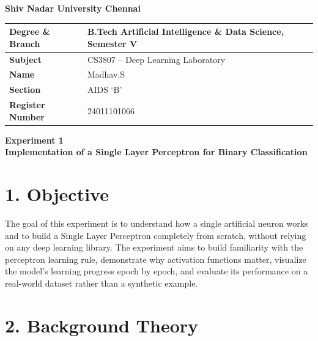 \documentclass[11pt]{article}
\begin{document}
\begin{center}
{\LARGE\textbf{Shiv Nadar University Chennai}}\\[4mm]
\end{center}

\renewcommand{\arraystretch}{1.6}
\setlength{\tabcolsep}{10pt}

\begin{center}
\begin{tabular}{|p{4cm}|p{9.5cm}|}
\hline
\textbf{Degree \& Branch} & B.Tech Artificial Intelligence \& Data Science, Semester V \\ \hline
\textbf{Subject} & CS3807 -- Deep Learning Laboratory \\ \hline
\textbf{Name} & Madhav.S \\ \hline
\textbf{Section} & AIDS `B' \\ \hline
\textbf{Register Number} & 24011101066 \\ \hline
\end{tabular}
\end{center}

\vspace{5mm}

\begin{center}
{\Large\textbf{Experiment 1}}\\[1mm]
{\large\textbf{Implementation of a Single Layer Perceptron for Binary Classification}}
\end{center}

\vspace{4mm}


\section*{1. Objective}

The goal of this experiment is to understand how a single artificial neuron works and to build a Single Layer Perceptron completely from scratch, without relying on any deep learning library. The experiment aims to build familiarity with the perceptron learning rule, demonstrate why activation functions matter, visualize the model's learning progress epoch by epoch, and evaluate its performance on a real-world dataset rather than a synthetic example.


\section*{2. Background Theory}
\end{document}
